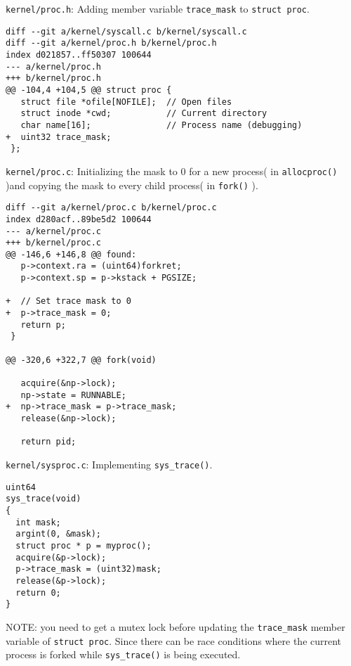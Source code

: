 \documentclass{article}
\begin{document}
\texttt{kernel/proc.h}: Adding member variable \texttt{trace\_mask} to \texttt{struct proc}.
\begin{verbatim}
diff --git a/kernel/syscall.c b/kernel/syscall.c
diff --git a/kernel/proc.h b/kernel/proc.h
index d021857..ff50307 100644
--- a/kernel/proc.h
+++ b/kernel/proc.h
@@ -104,4 +104,5 @@ struct proc {
   struct file *ofile[NOFILE];  // Open files
   struct inode *cwd;           // Current directory
   char name[16];               // Process name (debugging)
+  uint32 trace_mask;
 };
\end{verbatim}

\texttt{kernel/proc.c}: Initializing the mask to 0 for a new process( in \texttt{allocproc()} )and copying the mask to every child process( in \texttt{fork()} ).
\begin{verbatim}
diff --git a/kernel/proc.c b/kernel/proc.c
index d280acf..89be5d2 100644
--- a/kernel/proc.c
+++ b/kernel/proc.c
@@ -146,6 +146,8 @@ found:
   p->context.ra = (uint64)forkret;
   p->context.sp = p->kstack + PGSIZE;
 
+  // Set trace mask to 0
+  p->trace_mask = 0;
   return p;
 }
 
@@ -320,6 +322,7 @@ fork(void)
 
   acquire(&np->lock);
   np->state = RUNNABLE;
+  np->trace_mask = p->trace_mask;
   release(&np->lock);
 
   return pid;
\end{verbatim}

\texttt{kernel/sysproc.c}: Implementing \texttt{sys\_trace()}.
\begin{verbatim}
uint64
sys_trace(void)
{
  int mask;
  argint(0, &mask);
  struct proc * p = myproc();
  acquire(&p->lock);
  p->trace_mask = (uint32)mask;
  release(&p->lock);
  return 0;
}
\end{verbatim}
NOTE: you need to get a mutex lock before updating the \texttt{trace\_mask} member variable of \texttt{struct proc}. Since there can be race conditions where the current process is forked while \texttt{sys\_trace()} is being executed.
\end{document}
